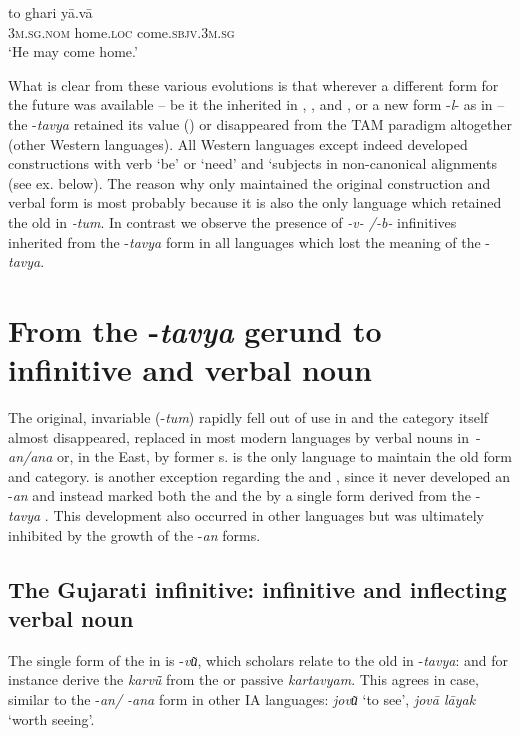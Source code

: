 \documentclass[output=paper]{langsci/langscibook}
\begin{document}
\ea
\label{ex:montaut:32}
\gll to             ghari          yā.vā\\
\textsc{3m.sg.nom}  home.\textsc{loc}   come.\textsc{sbjv.3m.sg}   \\ 
\glt ‘He may come home.’
\z 

What is clear from these various evolutions is that wherever a different form for the future was available – be it the inherited  in , , and , or a new form -\textit{l}{}- as in  – the -\textit{tavya}  retained its  value () or disappeared from the TAM paradigm altogether (other Western languages). All Western languages except  indeed developed  constructions with verb ‘be’ or ‘need’ and  ‘subjects in non-canonical alignments (see ex.  below). The reason why only  maintained the original construction and verbal form is most probably because it is also the only language which retained the old   in \textit{-tum}. In contrast we observe the presence of \textit{-v- /-b-} infinitives inherited from the -\textit{tavya} form in all languages which lost the  meaning of the  -\textit{tavya}.

\section{From the -\textit{tavya} gerund to infinitive and verbal noun}\label{sec:montaut:4}

The original, invariable   (-\textit{tum}) rapidly fell out of use in  and the category itself almost disappeared, replaced in most modern languages by verbal nouns in~-\textit{an/ana}  or, in the East, by former s.  is the only language to maintain the old form and category.  is another exception regarding the  and , since it never developed an -\textit{an}  and instead marked both the  and the  by a single form derived from the -\textit{tavya} . This development also occurred in other languages but was ultimately inhibited by the growth of the -\textit{an} forms.

\subsection{The Gujarati infinitive: infinitive and inflecting verbal noun}
The single form of the  in  is -\textit{vu͂}, which scholars relate to the old  in -\textit{tavya}: \citet[64]{Dave1935} and \citet[966]{Chatterji1926} for instance derive the   \textit{karv\~{ū}} from the  or passive   \textit{kartavyam}. This  agrees in case, similar to the -{\textit{an/ -ana}} {form}{} in other IA languages: \textit{jovu͂} ‘to see’, \textit{jovā lāyak} ‘worth seeing’.
\end{document}
